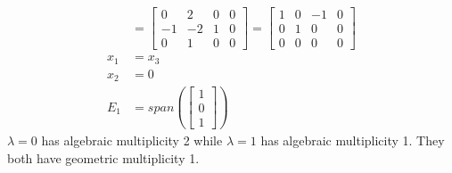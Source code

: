 \documentclass{math}
\begin{document}
\begin{align*}
  [A-1I|0] &= \begin{bmatrix}
    0 & 2 & 0 & 0 \\
    -1 & -2 & 1 & 0 \\
    0 & 1 & 0 & 0
  \end{bmatrix} = \begin{bmatrix}
    1 & 0 & -1 & 0 \\
    0 & 1 & 0 & 0 \\
    0 & 0 & 0 & 0
  \end{bmatrix} \\
  x_1 &= x_3 \\
  x_2 &= 0 \\
  E_1 &= span\left(\begin{bmatrix}1 \\ 0 \\ 1\end{bmatrix}\right)
\end{align*}
\( \lambda = 0 \) has algebraic multiplicity 2 while \( \lambda = 1 \) has
algebraic multiplicity 1. They both have geometric multiplicity 1.
\end{document}
